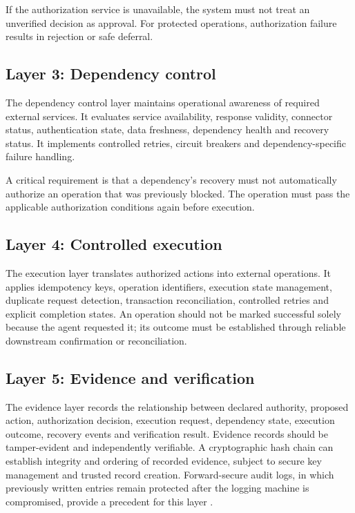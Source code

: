 \documentclass[11pt,a4paper]{article}
\begin{document}
If the authorization service is unavailable, the system must not treat an unverified decision as approval. For protected operations, authorization failure results in rejection or safe deferral.

\subsection{Layer 3: Dependency control}

The dependency control layer maintains operational awareness of required external services. It evaluates service availability, response validity, connector status, authentication state, data freshness, dependency health and recovery status. It implements controlled retries, circuit breakers and dependency-specific failure handling.

A critical requirement is that a dependency's recovery must not automatically authorize an operation that was previously blocked. The operation must pass the applicable authorization conditions again before execution.

\subsection{Layer 4: Controlled execution}

The execution layer translates authorized actions into external operations. It applies idempotency keys, operation identifiers, execution state management, duplicate request detection, transaction reconciliation, controlled retries and explicit completion states. An operation should not be marked successful solely because the agent requested it; its outcome must be established through reliable downstream confirmation or reconciliation.

\subsection{Layer 5: Evidence and verification}

The evidence layer records the relationship between declared authority, proposed action, authorization decision, execution request, dependency state, execution outcome, recovery events and verification result. Evidence records should be tamper-evident and independently verifiable. A cryptographic hash chain can establish integrity and ordering of recorded evidence, subject to secure key management and trusted record creation. Forward-secure audit logs, in which previously written entries remain protected after the logging machine is compromised, provide a precedent for this layer \cite{schneier}.
\end{document}
